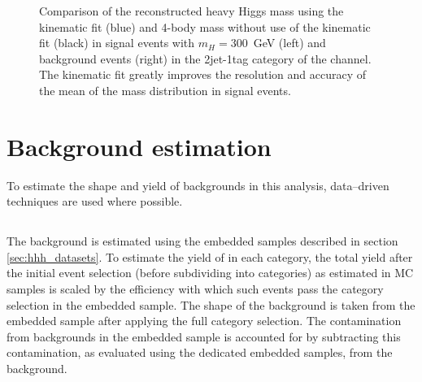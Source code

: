 \begin{figure}[h!]
\begin{center}
\end{center}
\caption{Comparison of the reconstructed heavy Higgs mass using the kinematic fit (blue) and
4-body mass without use of the kinematic fit (black) in signal events with $m_{H} = 300 $~GeV (left) and \ttbar background events (right) in 
the 2jet-1tag category of the \mutau channel. The kinematic fit greatly improves the resolution and 
accuracy of the mean of the mass distribution in signal events.}
\label{fig:kinfitvsmjj}
\end{figure}


\section{Background estimation}
\label{sec:hhh_backgrounds}
To estimate the shape and yield of backgrounds in this analysis, data--driven techniques are
used where possible. 
\subsection{\texorpdfstring{\Ztautau}{Z to tau tau}}
\label{sec:hhh_backgrounds_ztt}
The \Ztautau background is estimated using the embedded samples
described in section \ref{sec:hhh_datasets}. To estimate the 
yield of \Ztautau in each category, the total
yield after the initial event selection (before subdividing into categories) as
estimated in \Ztautau \ac{MC} samples is scaled by the efficiency with which 
such events pass the category selection in the embedded sample. The shape of
the \Ztautau background is taken from the embedded sample after applying the full
category selection. The contamination from \ttbar backgrounds in the embedded
sample is accounted for by subtracting this contamination, as evaluated using
the dedicated \ttbar embedded samples, from the \Ztautau background.
